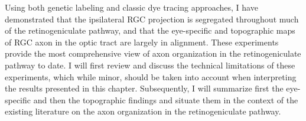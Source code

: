 Using both genetic labeling and classic dye tracing approaches, I have demonstrated that the ipsilateral RGC projection is segregated throughout much of the retinogeniculate pathway, and that the eye-specific and topographic maps of RGC axon in the optic tract are largely in alignment.
These experiments provide the most comprehensive view of axon organization in the retinogeniculate pathway to date.
I will first review and discuss the technical limitations of these experiments, which while minor, should be taken into account when interpreting the results presented in this chapter.
Subsequently, I will summarize first the eye-specific and then the topographic findings and situate them in the context of the existing literature on the axon organization in the retinogeniculate pathway.